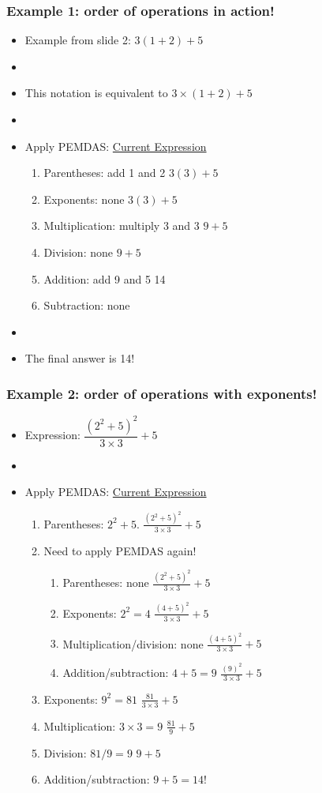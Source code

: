 \documentclass[12pt]{beamer}
\newcommand{\myframe}[1]{\begin{frame} \frametitle{#1}}
\begin{document}
\myframe{Example 1: order of operations in action!}
\begin{itemize}
\item Example from slide 2: $3(1 + 2) + 5$
\item[]
\item This notation is equivalent to $3\times (1+2) + 5$
\item[]
\item Apply PEMDAS: \hfill \underline{Current Expression}
\begin{enumerate}
\item Parentheses: add 1 and 2 \hfill $3(3) + 5$
\item Exponents: none \hfill $3(3) + 5$
\item Multiplication: multiply 3 and 3 \hfill $9 + 5$
\item Division: none \hfill $9 + 5$
\item Addition: add 9 and 5 \hfill 14
\item Subtraction: none
\end{enumerate}
\item[]
\item The final answer is 14!
\end{itemize}
\end{frame}

\myframe{Example 2: order of operations with exponents!}
\begin{itemize}
\item Expression: $\dfrac{(2^2 + 5)^2}{3\times 3} + 5$
\item[]
\item Apply PEMDAS: \hfill \underline{Current Expression}
\begin{enumerate}
\item Parentheses: $2^2 + 5$. \hfill $\frac{(2^2 + 5)^2}{3\times 3} + 5$
\item[] Need to apply PEMDAS again!
\begin{enumerate}
\item Parentheses: none \hfill $\frac{(2^2 + 5)^2}{3\times 3} + 5$
\item Exponents: $2^2 = 4$ \hfill $\frac{(4 + 5)^2}{3\times 3} + 5$
\item Multiplication/division: none \hfill $\frac{(4 + 5)^2}{3\times 3} + 5$
\item Addition/subtraction: $4 + 5 = 9$ \hfill $\frac{(9)^2}{3\times 3} + 5$
\end{enumerate}
\item Exponents: $9^2 = 81$ \hfill $\frac{81}{3\times 3} + 5$
\item Multiplication: $3 \times 3 = 9$ \hfill $\frac{81}{9} + 5$
\item Division: $81/9 = 9$ \hfill $9 + 5$
\item Addition/subtraction: $9 + 5 = 14$!
\end{enumerate}
\end{itemize}
\end{frame}
\end{document}
